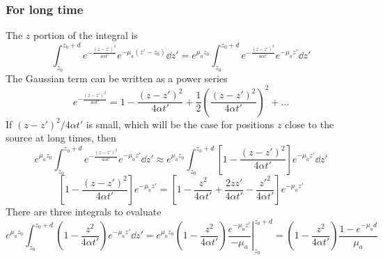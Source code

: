 \documentclass[]{article}
\begin{document}
\subsubsection{For long time}

The $z$ portion of the integral is
\begin{equation*}
    \int_{z_0}^{z_0 + d} e^{-\frac{(z-z')^2}{4\alpha t'}} e^{-\mu_a (z'-z_0)} \dd z' = e^{\mu_a z_0}\int_{z_0}^{z_0 + d} e^{-\frac{(z-z')^2}{4\alpha t'}} e^{-\mu_a z'} \dd z'
\end{equation*}
The Gaussian term can be written as a power series
\begin{equation*}
  e^{-\frac{(z-z')^2}{4\alpha t'}} = 1 - \frac{(z-z')^2}{4\alpha t'} + \frac{1}{2}\left(\frac{(z-z')^2}{4\alpha t'}\right)^2 + \ldots
\end{equation*}
If $(z-z')^2/4\alpha t'$ is small, which will be the case for positions $z$ close
to the source at long times, then
\begin{equation*}
   e^{\mu_a z_0} \int_{z_0}^{z_0 + d} e^{-\frac{(z-z')^2}{4\alpha t'}} e^{-\mu_a z'} \dd z' \approx
    e^{\mu_a z_0}\int_{z_0}^{z_0 + d} \left[1 - \frac{(z-z')^2}{4\alpha t'}\right] e^{-\mu_a z'} \dd z'
\end{equation*}
\begin{equation*}
    \left[1 - \frac{(z-z')^2}{4\alpha t'}\right] e^{-\mu_a z'}
=   \left[1 - \frac{z^2}{4\alpha t'} + \frac{2zz'}{4\alpha t'} -\frac{z'^2}{4\alpha t'}\right] e^{-\mu_a z'}
\end{equation*}
There are three integrals to evaluate
\begin{equation*}
   e^{\mu_a z_0} \int_{z_0}^{z_0 + d}
   \left(1 -  \frac{z^2}{4\alpha t'}\right)e^{-\mu_a z'}
    \dd z' =
   e^{\mu_a z_0} \left.\left(1 -  \frac{z^2}{4\alpha t'}\right)\frac{e^{-\mu_a z'}}{-\mu_a} \right|_{z_0}^{z_0 + d}
    = \left(1 -  \frac{z^2}{4\alpha t'}\right)\frac{1 - e^{-\mu_a d}}{\mu_a}
\end{equation*}
\end{document}
